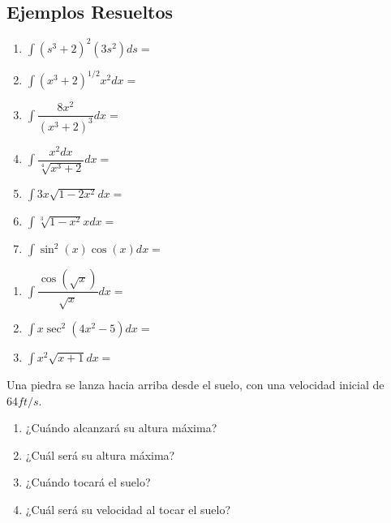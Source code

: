  \subsection{Ejemplos Resueltos}



  \begin{resuelto}
   \begin{enumerate}
    \item $\int \left( s^{3}+2 \right)^{2}(3s^{2})ds=$
    \item $\int \left( x^{3}+2 \right)^{1/2}x^{2}dx=$
    \item $\int \dfrac{8x^{2}}{\left( x^{3}+2 \right)^{3}}dx=$

    \item $\int\dfrac{x^{2}dx}{\sqrt[4]{x^{3}+2}}dx=$

    \item $\int 3x\sqrt{1-2x^{2}}dx=$

    \item $\int \sqrt[3]{1-x^{2}}xdx=$

    \item $\int \sin^{2}(x)\cos(x)dx=$
   \end{enumerate}


  \end{resuelto}




 \begin{resuelto}
  \begin{enumerate}
   \item $\int \dfrac{\cos(\sqrt{x})}{\sqrt{x}}dx=$

   \item $\int x\sec^{2}(4x^{2}-5)dx=$

   \item $\int x^{2}\sqrt{x+1} dx=$
  \end{enumerate}

 \end{resuelto}





  \begin{resuelto}
  \label{soc:solved:22.19}
   Una piedra se lanza hacia arriba desde el suelo, con una velocidad inicial de $64ft/s.$
   \begin{enumerate}
    \item ¿Cuándo alcanzará su altura máxima?
    \item ¿Cuál será su altura máxima?
    \item ¿Cuándo tocará el suelo?
    \item ¿Cuál será su velocidad al tocar el suelo?
   \end{enumerate}

  \end{resuelto}





